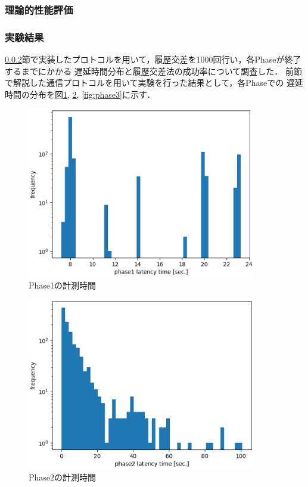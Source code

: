 \documentclass[a4paper,12pt]{jsarticle}
\begin{document}
\subsubsection{理論的性能評価}

\subsubsection{実験結果}
\ref{}節で実装したプロトコルを用いて，履歴交差を1000回行い，各Phaseが終了するまでにかかる
遅延時間分布と履歴交差法の成功率について調査した．
前節で解説した通信プロトコルを用いて実験を行った結果として，各Phaseでの
遅延時間の分布を図\ref{fig:phase1}, \ref{fig:phase2}, \ref{fig:phase3}に示す．
%
\begin{figure}[H]%
  \begin{center}
    \includegraphics[width=100mm]{pht/phase1-sec-hist.eps}
  \end{center}
  \caption{Phase1の計測時間}
  \label{fig:phase1}
\end{figure}
%
%
\begin{figure}[H]%
  \begin{center}
    \includegraphics[width=100mm]{pht/phase2-sec-hist.eps}
  \end{center}
  \caption{Phase2の計測時間}
  \label{fig:phase2}
\end{figure}
\end{document}
